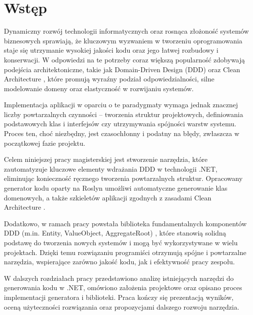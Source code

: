 \newpage
\section{Wstęp}
Dynamiczny rozwój technologii informatycznych oraz rosnąca złożoność systemów biznesowych sprawiają, że kluczowym wyzwaniem w tworzeniu oprogramowania staje się utrzymanie wysokiej jakości kodu oraz jego łatwej rozbudowy i konserwacji. W odpowiedzi na te potrzeby coraz większą popularność zdobywają podejścia architektoniczne, takie jak Domain-Driven Design (DDD) \cite{evans2004ddd} oraz Clean Architecture \cite{unclebob2018cleanarchitecture}, które promują wyraźny podział odpowiedzialności, silne modelowanie domeny oraz elastyczność w rozwijaniu systemów.

Implementacja aplikacji w oparciu o te paradygmaty wymaga jednak znacznej liczby powtarzalnych czynności – tworzenia struktur projektowych, definiowania podstawowych klas i interfejsów czy utrzymywania spójności warstw systemu. Proces ten, choć niezbędny, jest czasochłonny i podatny na błędy, zwłaszcza w początkowej fazie projektu.

Celem niniejszej pracy magisterskiej jest stworzenie narzędzia, które zautomatyzuje kluczowe elementy wdrażania DDD w technologii .NET, eliminując konieczność ręcznego tworzenia powtarzalnych struktur. Opracowany generator kodu oparty na Roslyn \cite{microsoft2024roslyn} umożliwi automatyczne generowanie klas domenowych, a także szkieletów aplikacji zgodnych z zasadami Clean Architecture \cite{unclebob2018cleanarchitecture}.

Dodatkowo, w ramach pracy powstała biblioteka fundamentalnych komponentów DDD (m.in. Entity, ValueObject, AggregateRoot) \cite{evans2004ddd}, które stanowią solidną podstawę do tworzenia nowych systemów i mogą być wykorzystywane w wielu projektach. Dzięki temu rozwiązaniu programiści otrzymują spójne i powtarzalne narzędzia, wspierające zarówno jakość kodu, jak i efektywność pracy zespołu.

W dalszych rozdziałach pracy przedstawiono analizę istniejących narzędzi do generowania kodu w .NET, omówiono założenia projektowe oraz opisano proces implementacji generatora i biblioteki. Praca kończy się prezentacją wyników, oceną użyteczności rozwiązania oraz propozycjami dalszego rozwoju narzędzia.